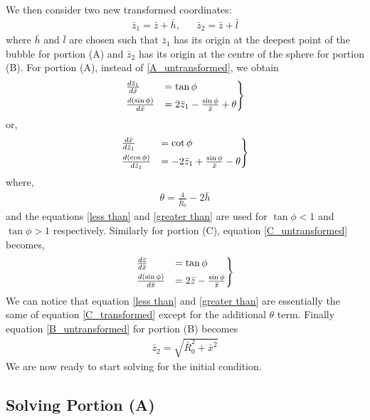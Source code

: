 We then consider two new transformed coordinates:
\begin{align}
    \bar{z}_1 = \bar{z}+\bar{h}, && \bar{z}_2=\bar{z}+\bar{l}
\end{align}
where $\bar{h}$ and $\bar{l}$ are chosen such that $\bar{z}_1$ has its origin at the deepest point of the bubble for portion (A) and $\bar{z}_2$ has its origin at the centre of the sphere for portion (B). For portion (A), instead of \ref{A_untransformed}, we obtain
\begin{align}\label{less than}
\begin{rcases}   
    \frac{d\bar{z}_1}{d\bar{x}} &= \tan \phi \\
    \frac{d(\sin\phi)}{d\bar{x}} &= 2\bar{z}_1 - \frac{\sin\phi}{\bar{x}} + \theta
\end{rcases} 
\end{align}
or,
\begin{align}\label{greater than}
\begin{rcases}
    \frac{d\bar{x}}{d\bar{z}_1} &= \cot \phi \\
    \frac{d(\cos\phi)}{d\bar{z}_1} &= -2\bar{z}_1 + \frac{\sin\phi}{\bar{x}} - \theta
\end{rcases}
\end{align}
where,
\begin{align}
    \theta = \frac{4}{\bar{R}_0} - 2\bar{h}
\end{align}
and the equations \ref{less than} and \ref{greater than} are used for $\tan\phi <1$ and $\tan\phi >1$ respectively. Similarly for portion (C), equation \ref{C_untransformed} becomes,
\begin{align}\label{C_transformed}
\begin{rcases}   
    \frac{d\bar{z}}{d\bar{x}} &= \tan \phi \\
    \frac{d(\sin\phi)}{d\bar{x}} &= 2\bar{z} - \frac{\sin\phi}{\bar{x}}
\end{rcases} 
\end{align}
We can notice that equation \ref{less than} and \ref{greater than} are essentially the same of equation \ref{C_transformed} except for the additional $\theta$ term. Finally equation \ref{B_untransformed} for portion (B) becomes
\begin{align}\label{Eq_B}
    \bar{z}_2 = \sqrt{ \bar{R}_0^2+\bar{x}^2}
\end{align}
We are now ready to start solving for the initial condition.

\subsection{Solving Portion (A)}

